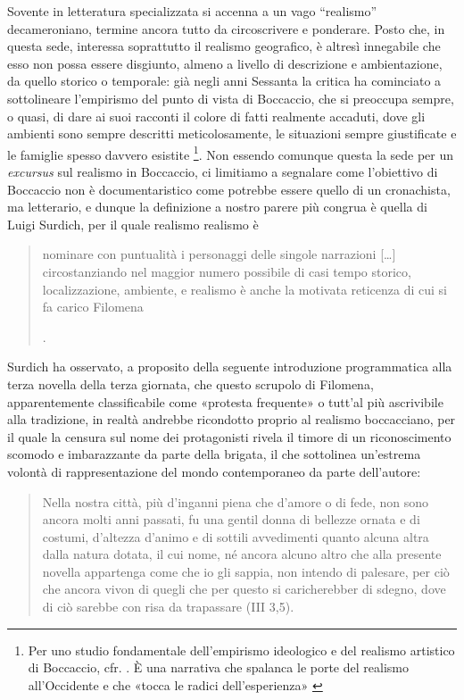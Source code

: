 Sovente in letteratura specializzata si accenna a un vago ``realismo''
decameroniano, termine ancora tutto da circoscrivere e ponderare. Posto
che, in questa sede, interessa soprattutto il realismo geografico, è
altresì innegabile che esso non possa essere disgiunto, almeno a livello
di descrizione e ambientazione, da quello storico o temporale: già negli
anni Sessanta la critica ha cominciato a sottolineare l'empirismo del
punto di vista di Boccaccio, che si preoccupa sempre, o quasi, di dare
ai suoi racconti il colore di fatti realmente accaduti, dove gli
ambienti sono sempre descritti meticolosamente, le situazioni sempre
giustificate e le famiglie spesso davvero esistite \footnote{Per uno
  studio fondamentale dell'empirismo ideologico e del realismo artistico
  di Boccaccio, cfr. \autocite[pp.~6-22]{1966decameron}. È una narrativa
  che spalanca le porte del realismo all'Occidente e che «tocca le
  radici dell'esperienza» \autocite[p.~229]{battaglia1993}}. Non essendo
comunque questa la sede per un \emph{excursus} sul realismo in
Boccaccio, ci limitiamo a segnalare come l'obiettivo di Boccaccio non è
documentaristico come potrebbe essere quello di un cronachista, ma
letterario, e dunque la definizione a nostro parere più congrua è quella
di Luigi Surdich, per il quale realismo realismo è

\begin{quote}
nominare con puntualità i personaggi delle singole narrazioni
{[}\ldots{}{]} circostanziando nel maggior numero possibile di casi
tempo storico, localizzazione, ambiente, e realismo è anche la motivata
reticenza di cui si fa carico Filomena

\autocite[p.~96]{surdich2008boccaccio}.
\end{quote}

Surdich ha osservato, a proposito della seguente introduzione
programmatica alla terza novella della terza giornata, che questo
scrupolo di Filomena, apparentemente classificabile come «protesta
frequente» \autocite[p.~347]{brancadecameron} o tutt'al più ascrivibile
alla tradizione, in realtà andrebbe ricondotto proprio al realismo
boccacciano, per il quale la censura sul nome dei protagonisti rivela il
timore di un riconoscimento scomodo e imbarazzante da parte della
brigata, il che sottolinea un'estrema volontà di rappresentazione del
mondo contemporaneo da parte dell'autore:

\begin{quote}
Nella nostra città, più d'inganni piena che d'amore o di fede, non sono
ancora molti anni passati, fu una gentil donna di bellezze ornata e di
costumi, d'altezza d'animo e di sottili avvedimenti quanto alcuna altra
dalla natura dotata, il cui nome, né ancora alcuno altro che alla
presente novella appartenga come che io gli sappia, non intendo di
palesare, per ciò che ancora vivon di quegli che per questo si
caricherebber di sdegno, dove di ciò sarebbe con risa da trapassare (III
3,5).
\end{quote}

